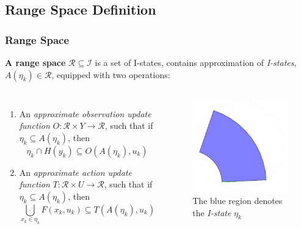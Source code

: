 \documentclass[compress]{beamer}
\begin{document}
\subsection[Range Space Definition]{Range Space Definition}
\begin{frame} \frametitle{Range Space}
\begin{definition}{\textbf{A range space}}
 $\mathcal{R} \subseteq \mathcal{I}$ is a set of I-states, contains
 approximation of \emph{I-states}, $A(\eta_k) \in \mathcal{R}$, equipped with
 two operations:
\end{definition}
\begin{columns}
\begin{enumerate}
\item An \emph{approximate observation update function} $O: \mathcal{R} \times
		Y \to \mathcal{R}$, such that if $\eta_k \subseteq A(\eta_k)$, then
			$$\eta_k \cap H(y_k) \subseteq O(A(\eta_k), u_k)$$
\item An \emph{approximate action update function} $T: \mathcal{R} \times U \to
		\mathcal{R}$, such that if $\eta_k \subseteq A(\eta_k)$, then
			$$\bigcup_{x_k \in \eta_k} F(x_k, u_k) \subseteq T(A(\eta_k), u_k)$$
\end{enumerate}
    \begin{figure}
    \includegraphics[scale=0.3]{norangespace.jpg}
    \caption{The blue region denotes the \emph{I-state} $\eta_k$}
    \end{figure}
\end{columns}
\end{frame}
\end{document}
